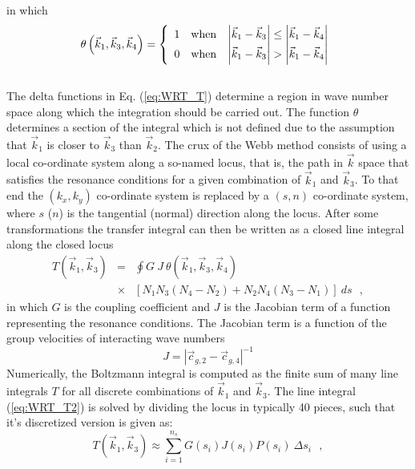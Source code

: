 \documentclass[12pt]{book}
\begin{document}
in which
\begin{equation}
\theta \left( {\vec{k}_1 ,\vec{k}_3 ,\vec{k}_4 } \right) = \left\{ {\begin{array}{*{20}c}
   1 & {\rm{when}} & {\left| {\vec{k}_1  - \vec{k}_3 } \right| \leq \left| {\vec{k}_1  - \vec{k}_4 } \right|}  \\
   0 & {\rm{when}} & {\left| {\vec{k}_1  - \vec{k}_3 } \right| > \left| {\vec{k}_1  - \vec{k}_4 } \right|}  \\
 \end{array} } \right.
\end{equation}
\nocite{Her80H}
\\[2ex]
\noindent
The delta functions in Eq. (\ref{eq:WRT_T}) determine a region in
wave number space along which the integration should be carried out.
The function $\theta$ determines a section of the integral which is
not defined due to the assumption that
$\vec{k}_1$ is closer to $\vec{k}_3$ than $\vec{k}_2$. The crux of the Webb method
consists of using a local co-ordinate system along a so-named
locus, that is, the path in $\vec{k}$ space that satisfies the resonance conditions for a given combination
of $\vec{k}_1$ and $\vec{k}_3$. To that end the $(k_{x},k_{y})$ co-ordinate system is
replaced by a $(s,n)$ co-ordinate system, where $s$ ($n$) is the tangential (normal) direction
along the locus. After some
transformations the transfer integral can then be written as a closed
line integral along the closed locus
\begin{eqnarray}
T \left( \vec{k}_1 ,\vec{k}_3 \right) & = & \oint G \: J
\: \theta ( \vec{k}_1 , \vec{k}_3 , \vec{k}_4 ) \nonumber \\
& \times & \left [ N_1 N_3 \left ( N_4 - N_2 \right ) + N_2 N_4 \left
(
N_3  - N_1 \right ) \right ] \: d s  \:\:\: , \label{eq:WRT_T2}
\end{eqnarray}
in which $G$ is the coupling coefficient and $J$
is the Jacobian term of a function representing the resonance conditions.
The Jacobian term is a function of the group velocities of interacting wave
numbers
\begin{equation}
  J = | \vec{c}_{g,2} - \vec{c}_{g,4}|^{-1}
\end{equation}
Numerically, the Boltzmann integral is computed as the finite sum of
many line integrals $T$ for all discrete combinations of $\vec{k}_1$ and
$\vec{k}_3$. The line integral (\ref{eq:WRT_T2}) is solved by dividing the
locus in typically 40 pieces, such that it's discretized version is
given as:
\begin{equation}
T\left( {\vec{k}_1 ,\vec{k}_3 } \right) \approx \sum_{i=1}^{n_s } G(s_i)
J(s_i) P(s_i) \: \Delta s_i \:\:\: ,
\end{equation}
\end{document}
